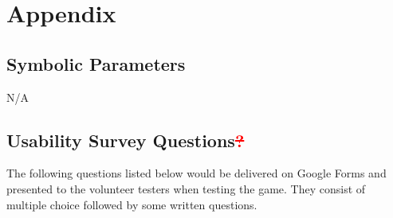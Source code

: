 \documentclass[12pt, titlepage]{article}
\begin{document}


% 


\newpage

\section{Appendix}

\subsection{Symbolic Parameters}

N/A

\subsection{Usability Survey Questions\textcolor{red}{\sout{?}}}
The following questions listed below would be delivered on Google Forms and presented to the volunteer testers when testing the game. They consist of multiple choice followed by some written questions.
\end{document}
